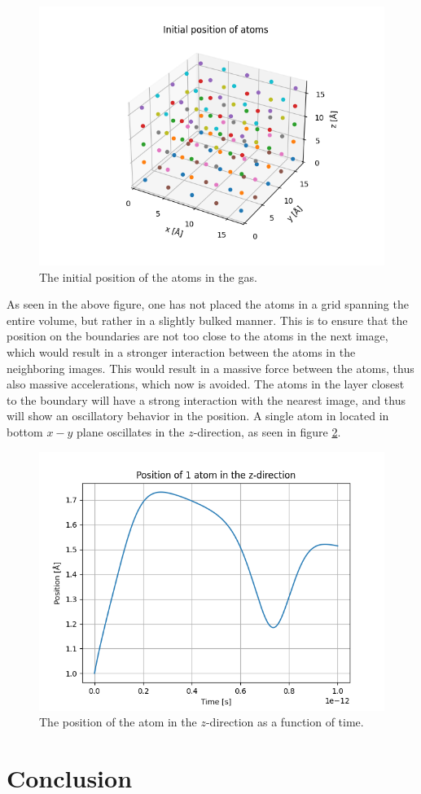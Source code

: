 \documentclass[a4paper]{article}
\begin{document}
\begin{figure}[H]
    \centering
    \includegraphics[scale = 0.5]{initial_position.png}
    \caption{The initial position of the atoms in the gas.}
    \label{fig: initial position gas}
\end{figure}\noindent
As seen in the above figure, one has not placed the atoms in a grid spanning the entire volume, but rather in a slightly bulked manner. This is to ensure that the position on the boundaries are not too close to the atoms in the next image, which would result in a stronger interaction between the atoms in the neighboring images.
This would result in a massive force between the atoms, thus also massive accelerations, which now is avoided.
The atoms in the layer closest to the boundary will have a strong interaction with the nearest image, and thus will show an oscillatory behavior in the position. A single atom in located in bottom $x-y$ plane oscillates in the $z$-direction, as seen in figure \ref{fig: z-direction-gas}.

\begin{figure}[H]
    \centering
    \includegraphics[scale = .5]{pos-z_direction.png}
    \caption{The position of the atom in the $z$-direction as a function of time.}
    \label{fig: z-direction-gas}
\end{figure}


\section{Conclusion}
\end{document}

